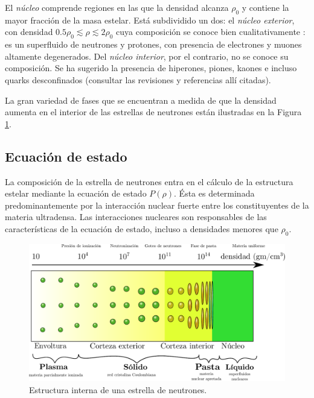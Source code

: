 El \emph{núcleo} comprende regiones en las que la densidad alcanza $\rho_0$ y contiene la mayor fracción de la masa estelar. Está subdividido un dos: el \emph{núcleo exterior}, con densidad $\num{0.5}\rho_0\lesssim\rho\lesssim 2\rho_0$  cuya composición se conoce bien cualitativamente \cite{Haensel2007NeutronStructure}: es un superfluido de neutrones y protones, con presencia de electrones y muones altamente degenerados. Del \emph{núcleo interior}, por el contrario, no se conoce su composición. Se ha sugerido la presencia de hiperones, piones, kaones e incluso quarks desconfinados (consultar las revisiones \cite{Lattimer2004,Potekhin} y referencias allí citadas).



La gran variedad de fases que se encuentran a medida de que la densidad aumenta en el interior de las estrellas de neutrones están ilustradas en la Figura \ref{NSS}. 

   



\subsection{Ecuación de estado}

La composición de la estrella de neutrones entra en el cálculo de la estructura estelar mediante la ecuación de estado $P(\rho)$. Ésta es determinada predominantemente por la interacción nuclear fuerte entre los constituyentes de la materia ultradensa. Las interacciones nucleares son responsables de las características de la ecuación de estado, incluso a densidades menores que $\rho_0$. 

\begin{figure}[H]
    \centering
    \includegraphics[width=420pt]{figures/Density.pdf}
    \caption[Estructura interna de una estrella de neutrones]{Estructura interna de una estrella de neutrones.\protect\footnotemark}
    \label{NSS}
\end{figure}

